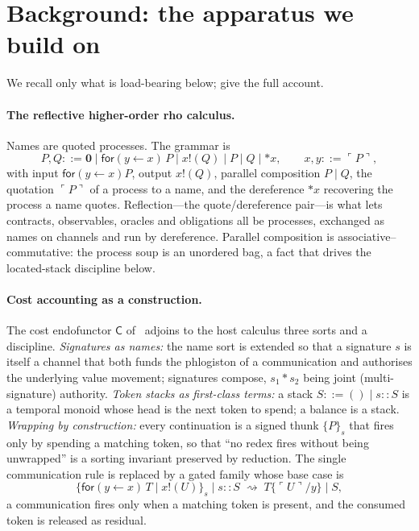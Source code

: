 \documentclass[11pt]{article}
\newcommand{\quoteP}[1]{\ulcorner #1 \urcorner}
\newcommand{\deref}[1]{{\ast}#1}
\newcommand{\bnf}{\mathrel{::=}}
\newcommand{\sigj}{s_{1}\!\ast\! s_{2}}
\newcommand{\Csig}{\mathsf{C}}
\begin{document}
\section{Background: the apparatus we build on}\label{sec:background}

We recall only what is load-bearing below; \cite{finrho,cost,cigslt} give the full account.

\paragraph{The reflective higher-order rho calculus.} Names are quoted processes. The
grammar is
\[
P,Q \bnf \mathbf{0} \mid \mathsf{for}(y \leftarrow x)\,P \mid x!(Q) \mid P \mid Q \mid \deref{x},
\qquad x,y \bnf \quoteP{P},
\]
with input $\mathsf{for}(y\leftarrow x)P$, output $x!(Q)$, parallel composition $P \mid Q$,
the quotation $\quoteP{P}$ of a process to a name, and the dereference $\deref{x}$ recovering
the process a name quotes. Reflection---the quote/dereference pair---is what lets contracts,
observables, oracles and obligations all be processes, exchanged as names on channels and run
by dereference. Parallel composition is associative--commutative: the process soup is an
unordered bag, a fact that drives the located-stack discipline below.

\paragraph{Cost accounting as a construction.} The cost endofunctor $\Csig$ of~\cite{cigslt}
adjoins to the host calculus three sorts and a discipline. \emph{Signatures as names:} the
name sort is extended so that a signature $s$ is itself a channel that both funds the
phlogiston of a communication and authorises the underlying value movement; signatures
compose, $\sigj$ being joint (multi-signature) authority. \emph{Token stacks as first-class
terms:} a stack $S \bnf () \mid s :: S$ is a temporal monoid whose head is the next token to
spend; a balance is a stack. \emph{Wrapping by construction:} every continuation is a signed
thunk $\{P\}_s$ that fires only by spending a matching token, so that ``no redex fires without
being unwrapped'' is a sorting invariant preserved by reduction. The single communication
rule is replaced by a gated family whose base case is
\[
\{\mathsf{for}(y \leftarrow x)\,T \mid x!(U)\}_s \mid s :: S
\;\rightsquigarrow\;
T\{\quoteP{U}/y\} \mid S,
\]
a communication fires only when a matching token is present, and the consumed token is
released as residual.
\end{document}
